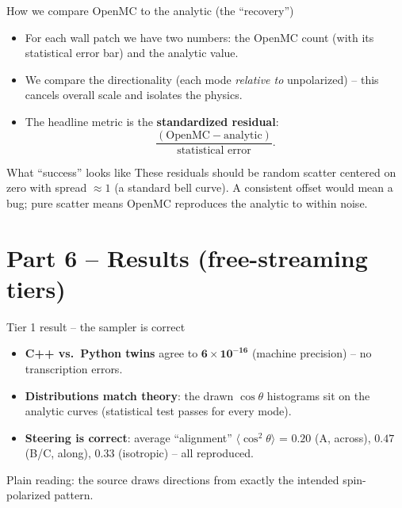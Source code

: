\documentclass[aspectratio=169]{beamer}
\newcommand{\keyword}[1]{\textcolor{blue!60!black}{\textbf{#1}}}
\begin{document}
\begin{frame}{How we compare OpenMC to the analytic (the ``recovery'')}
  \begin{itemize}
    \item For each wall patch we have \alert{two numbers}: the OpenMC count (with its statistical error bar) and the analytic value.
    \item We compare the \alert{directionality} (each mode \emph{relative to} unpolarized) -- this cancels overall scale and isolates the physics.
    \item The headline metric is the \keyword{standardized residual}:
      \[
        \frac{(\text{OpenMC} - \text{analytic})}{\text{statistical error}} .
      \]
  \end{itemize}
  \vfill
  \begin{block}{What ``success'' looks like}
    These residuals should be \alert{random scatter centered on zero with spread $\approx 1$} (a standard bell curve). A consistent offset would mean a \alert{bug}; pure scatter means \alert{OpenMC reproduces the analytic to within noise}.
  \end{block}
\end{frame}

\section{Part 6 -- Results (free-streaming tiers)}
\begin{frame}{Tier 1 result -- the sampler is correct}
  \begin{itemize}
    \item \keyword{C++ vs.\ Python twins} agree to $\mathbf{6\times10^{-16}}$ (machine precision) -- no transcription errors.
    \item \keyword{Distributions match theory}: the drawn $\cos\theta$ histograms sit on the analytic curves (statistical test passes for every mode).
    \item \keyword{Steering is correct}: average ``alignment'' $\langle\cos^2\theta\rangle$ = $0.20$ (A, across), $0.47$ (B/C, along), $0.33$ (isotropic) -- all reproduced.
  \end{itemize}
  \vfill
  \footnotesize Plain reading: the source draws directions from \alert{exactly} the intended spin-polarized pattern.
\end{frame}
\end{document}
